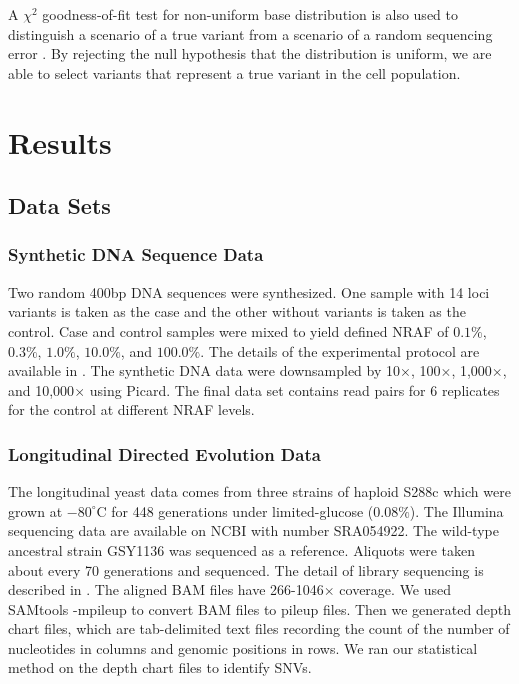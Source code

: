 \documentclass[11pt,reqno]{amsart}
\begin{document}
A $\chi^2$ goodness-of-fit test for non-uniform base distribution is also used to distinguish a scenario of a true variant from a scenario of a random sequencing error \citep{efron2010large, he2015rvd2}.
By rejecting the null hypothesis that the distribution is uniform, we are able to select variants that represent a true variant in the cell population.
\section{Results}
\subsection{Data Sets}
\subsubsection{Synthetic DNA Sequence Data}
Two random 400bp DNA sequences were synthesized. One sample with 14 loci variants is taken as the case and the other without variants is taken as the control.
Case and control samples were mixed to yield defined NRAF of $0.1\%$, $0.3\%$, $1.0\%$, $10.0\%$, and $100.0\%$.
The details of the experimental protocol are available in \citep{flaherty2011ultrasensitive}.
The synthetic DNA data were downsampled by 10$\times$, 100$\times$, 1,000$\times$, and 10,000$\times$ using Picard.
The final data set contains read pairs for 6 replicates for the control at different NRAF levels.
\subsubsection{Longitudinal Directed Evolution Data}
The longitudinal yeast data comes from three strains of haploid S288c which were grown at $-80^{\circ }\textrm{C}$ for 448 generations under limited-glucose (0.08$\%$).
The Illumina sequencing data are available on NCBI with number SRA054922.
The wild-type ancestral strain GSY1136 was sequenced as a reference.
Aliquots were taken about every 70 generations and sequenced.
The detail of library sequencing is described in \citep{kvitek2013whole, kao2008molecular}.
The aligned BAM files have 266-1046$\times$ coverage.
We used SAMtools -mpileup to convert BAM files to pileup files.
Then we generated depth chart files, which are tab-delimited text files recording the count of the number of nucleotides in columns and genomic positions in rows.
We ran our statistical method on the depth chart files to identify SNVs.
\end{document}
